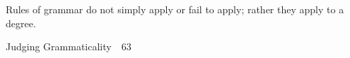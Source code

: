 \begin{listWWNumliiileveli}
\item 
\setcounter{listWWNumliiilevelii}{2}
\begin{listWWNumliiilevelii}
\item 
\setcounter{listWWNumliiileveliii}{0}
\begin{listWWNumliiileveliii}
\item 
\setcounter{listWWNumliiileveliv}{0}
\begin{listWWNumliiileveliv}
\item 
\begin{styleStandard}
Rules of grammar do not simply apply or fail to apply; rather they apply to a degree.
\end{styleStandard}


\end{listWWNumliiileveliv}
\end{listWWNumliiileveliii}
\end{listWWNumliiilevelii}
\end{listWWNumliiileveli}
\clearpage\setcounter{page}{1}\begin{styleStandard}
Judging Grammaticality\ \ 63
\end{styleStandard}


